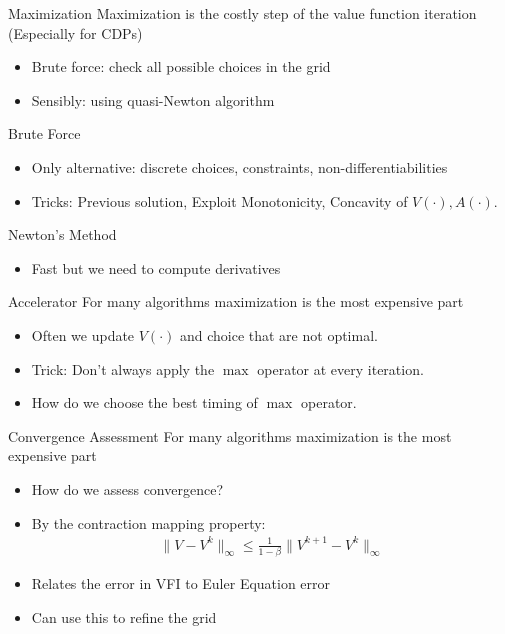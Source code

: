 \documentclass[xcolor=pdftex,dvipsnames,table,mathserif,aspectratio=169]{beamer}
\begin{document}
\begin{frame}{Maximization}
Maximization is the costly step of the value function iteration (Especially for CDPs)
\begin{itemize}
\item Brute force: check all possible choices in the grid
\item Sensibly: using quasi-Newton algorithm
\end{itemize}
Brute Force
\begin{itemize}
\item Only alternative: discrete choices, constraints, non-differentiabilities
\item Tricks: Previous solution, Exploit Monotonicity, Concavity of $V(\cdot), A(\cdot)$.
\end{itemize}
Newton's Method
\begin{itemize}
\item Fast but we need to compute derivatives
\end{itemize}
\end{frame}

\begin{frame}{Accelerator}
For many algorithms maximization is the most expensive part
\begin{itemize}
\item Often we update $V(\cdot)$ and choice that are not optimal.
\item Trick: Don't always apply the $\max$ operator at every iteration.
\item How do we choose the best timing of $\max$ operator.
\end{itemize}
\end{frame}


\begin{frame}{Convergence Assessment}
For many algorithms maximization is the most expensive part
\begin{itemize}
\item How do we assess convergence?
\item By the contraction mapping property: 
\begin{eqnarray*}
\|V-V^k\|_{\infty} \leq \frac{1}{1-\beta} \|V^{k+1} - V^{k} \|_{\infty}
\end{eqnarray*}
\item Relates the error in VFI to Euler Equation error
\item Can use this to refine the grid
\end{itemize}
\end{frame}
\end{document}
